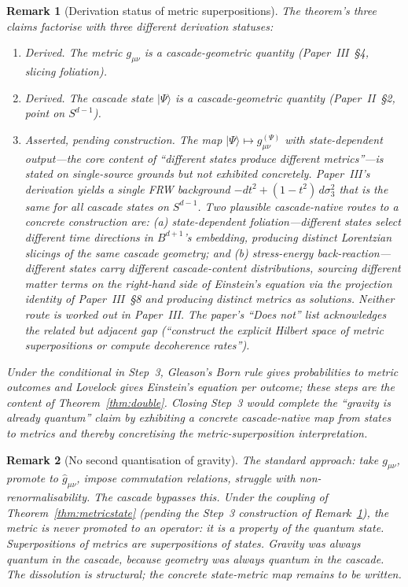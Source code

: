 \documentclass[12pt,a4paper]{article}
\newtheorem*{remark}{Remark}
\begin{document}
\begin{remark}[Derivation status of metric superpositions]\label{rem:sp25-status}
The theorem's three claims factorise with three different derivation
statuses:
\begin{enumerate}
\item \emph{Derived.} The metric $g_{\mu\nu}$ is a cascade-geometric
quantity (Paper~III~\S4, slicing foliation).
\item \emph{Derived.} The cascade state $|\Psi\rangle$ is a
cascade-geometric quantity (Paper~II~\S2, point on $S^{d-1}$).
\item \emph{Asserted, pending construction.} The map
$|\Psi\rangle \mapsto g_{\mu\nu}^{(\Psi)}$ with state-dependent
output---the core content of ``different states produce different
metrics''---is stated on single-source grounds but not exhibited
concretely. Paper~III's derivation yields a single FRW background
$-dt^2 + (1-t^2)\,d\sigma_3^2$ that is the same for all cascade states
on $S^{d-1}$. Two plausible cascade-native routes to a concrete
construction are: (a) state-dependent foliation---different states
select different time directions in $B^{d+1}$'s embedding, producing
distinct Lorentzian slicings of the same cascade geometry; and (b)
stress-energy back-reaction---different states carry different
cascade-content distributions, sourcing different matter terms on the
right-hand side of Einstein's equation via the projection identity of
Paper~III~\S8 and producing distinct metrics as solutions. Neither
route is worked out in Paper~III. The paper's ``Does not'' list acknowledges the
related but adjacent gap (``construct the explicit Hilbert space of
metric superpositions or compute decoherence rates'').
\end{enumerate}
Under the conditional in Step~3, Gleason's Born rule gives probabilities
to metric outcomes and Lovelock gives Einstein's equation per outcome;
these steps are the content of Theorem~\ref{thm:double}.
Closing Step~3 would complete the ``gravity is already quantum'' claim
by exhibiting a concrete cascade-native map from states to metrics and
thereby concretising the metric-superposition interpretation.
\end{remark}

\begin{remark}[No second quantisation of gravity]
The standard approach: take $g_{\mu\nu}$, promote to $\hat{g}_{\mu\nu}$,
impose commutation relations, struggle with non-renormalisability. The
cascade bypasses this. Under the coupling of Theorem~\ref{thm:metricstate}
(pending the Step~3 construction of
Remark~\ref{rem:sp25-status}), the metric is never promoted to an
operator: it is a property of the quantum state. Superpositions of
metrics are superpositions of states. Gravity was always quantum in the
cascade, because geometry was always quantum in the cascade. The
dissolution is structural; the concrete state-metric map remains to be
written.
\end{remark}
\end{document}
